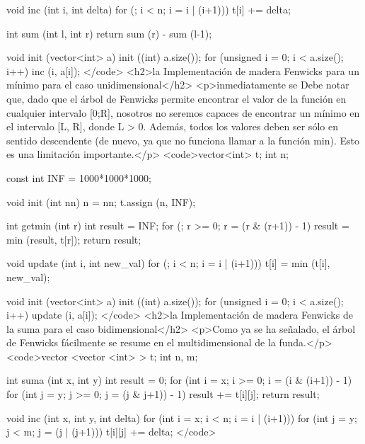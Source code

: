 void inc (int i, int delta)
{
for (; i < n; i = i | (i+1)))
t[i] += delta;
}

int sum (int l, int r)
{
return sum (r) - sum (l-1);
}

void init (vector<int> a)
{
init ((int) a.size());
for (unsigned i = 0; i < a.size(); i++)
inc (i, a[i]);
}</code>
<h2>la Implementación de madera Fenwicks para un mínimo para el caso unidimensional</h2>
<p>inmediatamente se Debe notar que, dado que el árbol de Fenwicks permite encontrar el valor de la función en cualquier intervalo [0;R], nosotros no seremos capaces de encontrar un mínimo en el intervalo [L, R], donde L > 0. Además, todos los valores deben ser sólo en sentido descendente (de nuevo, ya que no funciona llamar a la función min). Esto es una limitación importante.</p>
<code>vector<int> t;
int n;

const int INF = 1000*1000*1000;

void init (int nn)
{
n = nn;
t.assign (n, INF);
}

int getmin (int r)
{
int result = INF;
for (; r >= 0; r = (r & (r+1)) - 1)
result = min (result, t[r]);
return result;
}

void update (int i, int new_val)
{
for (; i < n; i = i | (i+1)))
t[i] = min (t[i], new_val);
}

void init (vector<int> a)
{
init ((int) a.size());
for (unsigned i = 0; i < a.size(); i++)
update (i, a[i]);
}</code>
<h2>la Implementación de madera Fenwicks de la suma para el caso bidimensional</h2>
<p>Como ya se ha señalado, el árbol de Fenwicks fácilmente se resume en el multidimensional de la funda.</p>
<code>vector <vector <int> > t;
int n, m;

int suma (int x, int y)
{
int result = 0;
for (int i = x; i >= 0; i = (i & (i+1)) - 1)
for (int j = y; j >= 0; j = (j & j+1)) - 1)
result += t[i][j];
return result;
}

void inc (int x, int y, int delta)
{
for (int i = x; i < n; i = i | (i+1)))
for (int j = y; j < m; j = (j | (j+1)))
t[i][j] += delta;
}</code>